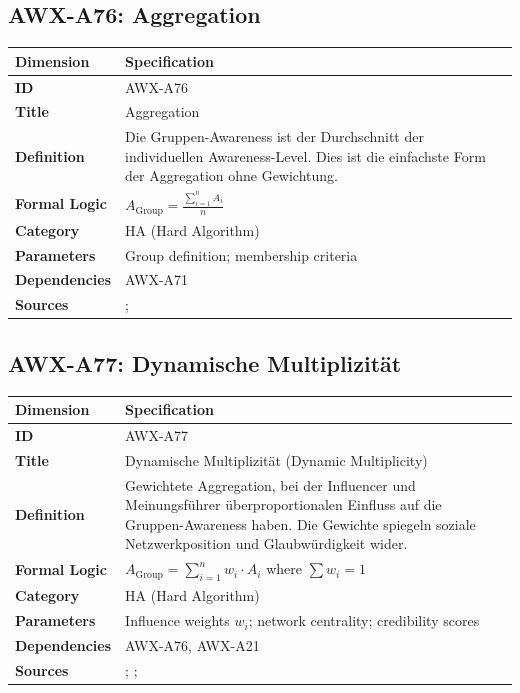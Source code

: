 \subsection{AWX-A76: Aggregation}

\begin{table}[htbp]
\small
\begin{tabular}{p{3cm}p{11cm}}
\toprule
\textbf{Dimension} & \textbf{Specification} \\
\midrule
\textbf{ID} & AWX-A76 \\
\textbf{Title} & Aggregation \\
\textbf{Definition} & Die Gruppen-Awareness ist der Durchschnitt der individuellen Awareness-Level. Dies ist die einfachste Form der Aggregation ohne Gewichtung. \\
\textbf{Formal Logic} & $A_{\text{Group}} = \frac{\sum_{i=1}^{n} A_i}{n}$ \\
\textbf{Category} & HA (Hard Algorithm) \\
\textbf{Parameters} & Group definition; membership criteria \\
\textbf{Dependencies} & AWX-A71 \\
\textbf{Sources} & \citet{arrow1951social}; \citet{surowiecki2004wisdom} \\
\bottomrule
\end{tabular}
\end{table}


\subsection{AWX-A77: Dynamische Multiplizität}

\begin{table}[htbp]
\small
\begin{tabular}{p{3cm}p{11cm}}
\toprule
\textbf{Dimension} & \textbf{Specification} \\
\midrule
\textbf{ID} & AWX-A77 \\
\textbf{Title} & Dynamische Multiplizität (Dynamic Multiplicity) \\
\textbf{Definition} & Gewichtete Aggregation, bei der Influencer und Meinungsführer überproportionalen Einfluss auf die Gruppen-Awareness haben. Die Gewichte spiegeln soziale Netzwerkposition und Glaubwürdigkeit wider. \\
\textbf{Formal Logic} & $A_{\text{Group}} = \sum_{i=1}^{n} w_i \cdot A_i$ where $\sum w_i = 1$ \\
\textbf{Category} & HA (Hard Algorithm) \\
\textbf{Parameters} & Influence weights $w_i$; network centrality; credibility scores \\
\textbf{Dependencies} & AWX-A76, AWX-A21 \\
\textbf{Sources} & \citet{katz1955personal}; \citet{watts2007influentials}; \citet{christakis2009connected} \\
\bottomrule
\end{tabular}
\end{table}

